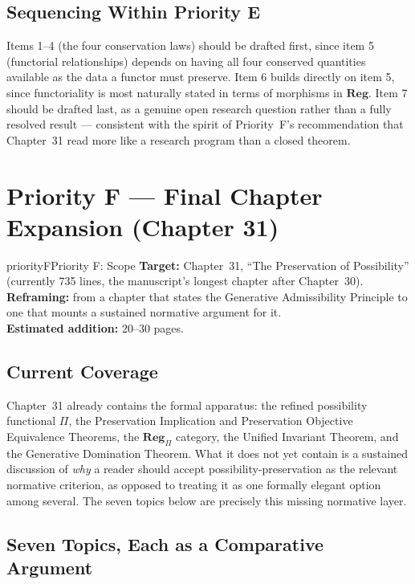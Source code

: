 \documentclass[11pt]{report}
\begin{document}
\section{Sequencing Within Priority E}

Items 1--4 (the four conservation laws) should be drafted
first, since item 5 (functorial relationships) depends on
having all four conserved quantities available as the data a
functor must preserve. Item 6 builds directly on item 5,
since functoriality is most naturally stated in terms of
morphisms in $\mathbf{Reg}$. Item 7 should be drafted last, as
a genuine open research question rather than a fully resolved
result --- consistent with the spirit of Priority~F's
recommendation that Chapter~31 read more like a research
program than a closed theorem.

\chapter{Priority F --- Final Chapter Expansion (Chapter 31)}
\label{ch:priority-f}

\begin{prioritybox}{priorityF}{Priority F: Scope}
\textbf{Target:} Chapter~31, ``The Preservation of
  Possibility'' (currently 735 lines, the manuscript's longest
  chapter after Chapter~30).\\
\textbf{Reframing:} from a chapter that states the Generative
  Admissibility Principle to one that mounts a sustained
  normative argument for it.\\
\textbf{Estimated addition:} 20--30 pages.
\end{prioritybox}

\section{Current Coverage}

Chapter~31 already contains the formal apparatus: the refined
possibility functional $\Pi$, the Preservation Implication and
Preservation Objective Equivalence Theorems, the
$\mathbf{Reg}_\Pi$ category, the Unified Invariant Theorem, and
the Generative Domination Theorem. What it does not yet contain
is a sustained discussion of \emph{why} a reader should accept
possibility-preservation as the relevant normative criterion,
as opposed to treating it as one formally elegant option among
several. The seven topics below are precisely this missing
normative layer.

\section{Seven Topics, Each as a Comparative Argument}
\end{document}
